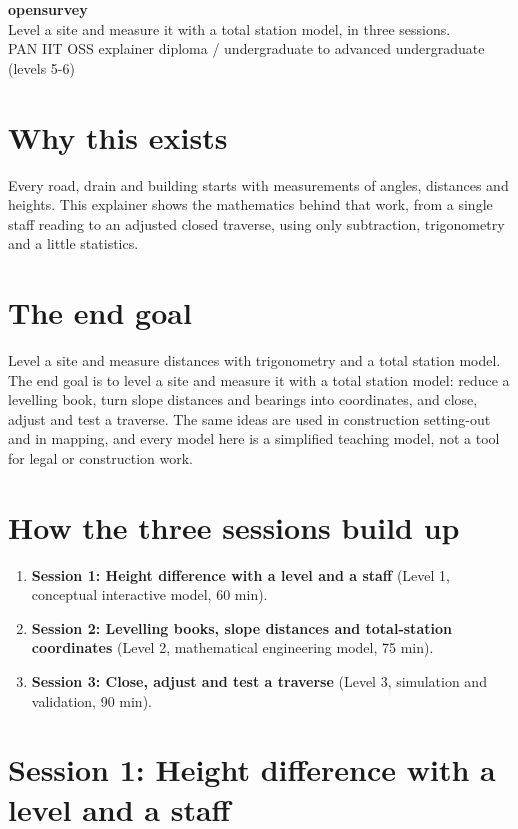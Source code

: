\documentclass[11pt,a4paper]{article}
\begin{document}
\begin{center}{\LARGE\bfseries opensurvey}\\[0.4em]{\large Level a site and measure it with a total station model, in three sessions.}\\[0.2em]\small PAN IIT OSS explainer \textbullet{} diploma / undergraduate to advanced undergraduate (levels 5-6)\end{center}

\section*{Why this exists}
Every road, drain and building starts with measurements of angles, distances and heights. This explainer shows the mathematics behind that work, from a single staff reading to an adjusted closed traverse, using only subtraction, trigonometry and a little statistics.

\section*{The end goal}
Level a site and measure distances with trigonometry and a total station model. The end goal is to level a site and measure it with a total station model: reduce a levelling book, turn slope distances and bearings into coordinates, and close, adjust and test a traverse. The same ideas are used in construction setting-out and in mapping, and every model here is a simplified teaching model, not a tool for legal or construction work.

\section*{How the three sessions build up}
\begin{enumerate}[nosep]
\item \textbf{Session 1: Height difference with a level and a staff} (Level 1, conceptual interactive model, 60 min).
\item \textbf{Session 2: Levelling books, slope distances and total-station coordinates} (Level 2, mathematical engineering model, 75 min).
\item \textbf{Session 3: Close, adjust and test a traverse} (Level 3, simulation and validation, 90 min).
\end{enumerate}

\section{Session 1: Height difference with a level and a staff}
\end{document}
